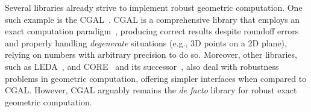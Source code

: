 Several libraries already strive to implement robust geometric computation.  One
such example is the \acf{CGAL}~\cite{CGAL:2018}.  \ac{CGAL} is a comprehensive
library that employs an exact computation paradigm~\cite{Yap:1995:ECP},
producing correct results despite roundoff errors and properly handling
\textit{degenerate} situations (e.g., 3D points on a 2D plane), relying on
numbers with arbitrary precision to do so.  Moreover, other libraries, such as
\acs{LEDA}\label{acro:LEDA}~\cite{LEDA:2017,Mehlhorn:1989:LEDA}, and
CORE~\cite{Karamcheti:1999:CLRNGC} and its successor~\cite{Yu:2010:CORE2}, also
deal with robustness problems in geometric computation, offering simpler
interfaces when compared to \ac{CGAL}.  However, \ac{CGAL} arguably remains the
\textit{de facto} library for robust exact geometric computation.
